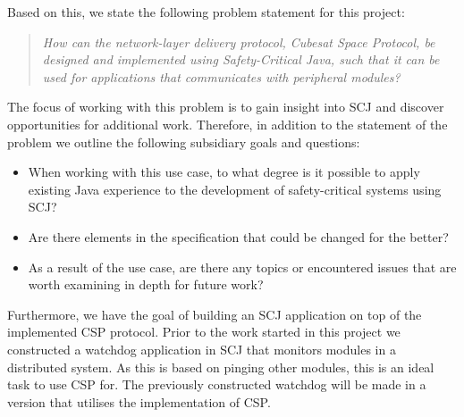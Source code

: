 Based on this, we state the following problem statement for this project:
\begin{quotation}
	\textit{How can the network-layer delivery protocol, Cubesat Space Protocol, be designed and implemented using Safety-Critical Java, such that it can be used for applications that communicates with peripheral modules?}
\end{quotation}
The focus of working with this problem is to gain insight into SCJ and discover opportunities for additional work. Therefore, in addition to the statement of the problem we outline the following subsidiary goals and questions:
\begin{itemize}
	\item When working with this use case, to what degree is it possible to apply existing Java experience to the development of safety-critical systems using SCJ?
	\item Are there elements in the specification that could be changed for the better?
	\item As a result of the use case, are there any topics or encountered issues that are worth examining in depth for future work?
\end{itemize}

Furthermore, we have the goal of building an SCJ application on top of the implemented CSP protocol. Prior to the work started in this project we constructed a watchdog application in SCJ that monitors modules in a distributed system. As this is based on pinging other modules, this is an ideal task to use CSP for. The previously constructed watchdog will be made in a version that utilises the implementation of CSP.

